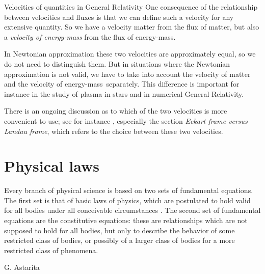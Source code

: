 \documentclass[a4paper,12pt,%
onecolumn,oneside,%
british%
]{memoir}
\newcommand*{\incr}{\Delta}%
\renewcommand*{\|}[1][]{\nonscript\:#1\vert\nonscript\:\mathopen{}}
\newcommand*{\energym}{energy-mass}
\begin{document}
\begin{extra}{Velocities of quantities in General Relativity}
  One consequence of the relationship between velocities and fluxes is that we can define such a velocity for any extensive quantity. So we have a velocity matter from the flux of matter, but also a \emph{velocity of \energym} from the flux of \energym.

  \smallskip

  In Newtonian approximation these two velocities are approximately equal, so we do not need to distinguish them. But in situations where the Newtonian approximation is not valid, we have to take into account the velocity of matter and the velocity of \energym\ separately. This difference is important for instance in the study of plasma in stars and in numerical General Relativity.

  \smallskip

  There is an ongoing discussion as to which of the two velocities is more convenient to use; see for instance \cites{kandusetal2008}, especially the section \emph{Eckart frame versus Landau frame}, which refers to the choice between these two velocities.
\end{extra}



\printpagenotes*
\cleartooddpage
\chapter{Physical laws}
\label{cha:laws}


\epigraph{Every branch of physical science is based on two sets of fundamental equations. The first set is that of basic laws of physics, which are postulated to hold valid for all bodies under all conceivable circumstances \textelp{}. The second set of fundamental equations are the constitutive equations: these are relationships which are not supposed to hold for all bodies, but only to describe the behavior of some restricted class of bodies, or possibly of a larger class of bodies for a more restricted class of phenomena.}{G. Astarita \cites*{astarita1989_r1990}}
\end{document}
